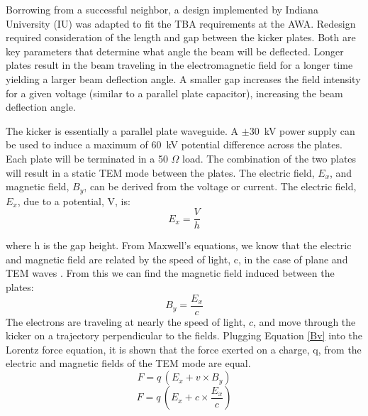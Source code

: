 Borrowing from a successful neighbor, a design implemented by Indiana University (IU) \cite{iukicker}
was adapted to fit the TBA requirements at the AWA. Redesign required consideration
of the length and gap between the kicker plates. Both are key parameters that determine 
what angle the beam will be deflected. Longer plates result in the beam traveling 
in the electromagnetic field for a longer time yielding a larger beam deflection angle. 
A smaller gap increases the field intensity for a given voltage (similar to a parallel plate 
capacitor), increasing the beam deflection angle. 


The kicker is essentially a parallel plate waveguide. 
A $\pm$\SI{30}{kV} power supply can be used to induce a maximum of \SI{60}{kV} potential difference 
across the plates. Each plate will be terminated in a 50 $\Omega$ load.  
The combination of the two plates will result in a static TEM mode 
between the plates. The electric field, $E_x$, and magnetic field, $B_y$,
can be derived from the voltage or current. The electric field, $E_x$, due to a potential, V, is: 
\begin{equation}
E_x=\frac{V}{h}
\end{equation}

where h is the gap height. From Maxwell's equations, we know that the electric and magnetic 
field are related by the speed of light, c, in the case of plane and TEM waves \cite{pozar}. 
From this we can find the magnetic field induced between the plates: 
\begin{equation}
B_y=\frac{E_x}{c}
\label{Bv}
\end{equation}
The electrons are traveling at nearly the speed of light, $c$, and move through the kicker on a 
trajectory perpendicular to the fields.  Plugging Equation \ref{Bv} into the Lorentz force equation, 
it is shown that the force exerted on a charge, q, 
from the electric and magnetic fields of the TEM mode are equal. 
\begin{equation}
F=q\,(E_x+v\times B_y)
\end{equation}
\begin{equation}
	F = q \,\left(E_x+c\times \frac{E_x}{c}\right)
\end{equation}

